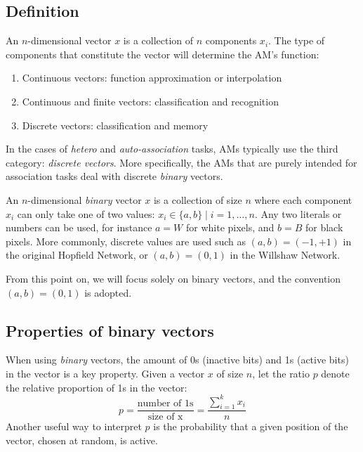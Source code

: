 \documentclass[runningheads]{llncs}
\begin{document}
\subsection{Definition}
\label{sec:inputoutput_def}
An $n$-dimensional vector $x$ is a collection of  $n$ components $x_i$. The type of components that constitute the vector will determine the AM's function:
\begin{enumerate}
    \item Continuous vectors: function approximation or interpolation
    \item Continuous and finite vectors: classification and recognition
    \item Discrete vectors: classification and memory
\end{enumerate}
In the cases of \textit{hetero} and \textit{auto-association} tasks, AMs typically use the third category:\textit{ discrete vectors}. More specifically, the AMs that are purely intended for association tasks deal with discrete \textit{binary} vectors.

An $n$-dimensional \textit{binary} vector $x$ is a collection of size $n$ where each component $x_i$ can only take one of two values: $x_i \in \{ a,b \} \mid i=1, \dots,n$.
Any two literals or numbers can be used, for instance $a=W$ for white pixels, and $b=B$ for black pixels. More commonly, discrete values are used such as $(a,b)=(-1,+1)$ in the original Hopfield Network, or $(a,b)=(0,1 )$ in the Willshaw Network.
\newline

From this point on, we will focus solely on binary vectors, and the convention $(a,b)=(0,1)$ is adopted.

\subsection{Properties of binary vectors}
\label{sec:inputoutput_propbin}
When using \textit{binary} vectors, the amount of 0s (inactive bits) and 1s (active bits) in the vector is a key property.
Given a vector $x$ of size $n$, let the ratio $p$ denote the relative proportion of 1s in the vector:
\begin{equation}
    p = \frac{\text{number of 1s}}{\text{size of x}} =  \frac{\sum\limits_{i=1}^k{x_i}}{n}
\end{equation}
Another useful way to interpret $p$ is the probability that a given position of the vector, chosen at random, is active.
\end{document}
